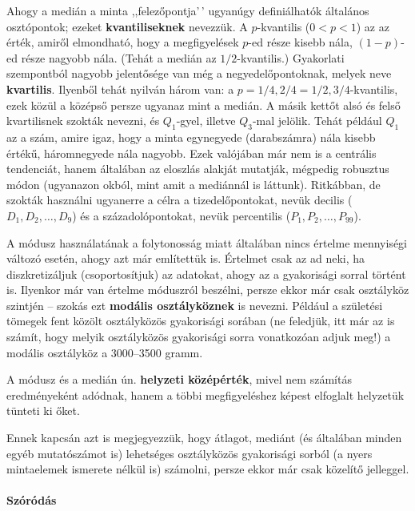 \documentclass[
]{book}
\begin{document}
Ahogy a medián a minta ,,felezőpontja'\,' ugyanúgy definiálhatók általános osztópontok; ezeket \textbf{kvantiliseknek} nevezzük. A \(p\)-kvantilis (\(0<p<1\)) az az érték, amiről elmondható, hogy a megfigyelések \(p\)-ed része kisebb nála, \(\left(1-p\right)\)-ed része nagyobb nála. (Tehát a medián az \(1/2\)-kvantilis.) Gyakorlati szempontból nagyobb jelentősége van még a negyedelőpontoknak, melyek neve \textbf{kvartilis}. Ilyenből tehát nyilván három van: a \(p=1/4,2/4=1/2,3/4\)-kvantilis, ezek közül a középső persze ugyanaz mint a medián. A másik kettőt alsó és felső kvartilisnek szokták nevezni, és \(Q_1\)-gyel, illetve \(Q_3\)-mal jelölik. Tehát például \(Q_1\) az a szám, amire igaz, hogy a minta egynegyede (darabszámra) nála kisebb értékű, háromnegyede nála nagyobb. Ezek valójában már nem is a centrális tendenciát, hanem általában az eloszlás alakját mutatják, mégpedig robusztus módon (ugyanazon okból, mint amit a mediánnál is láttunk). Ritkábban, de szokták használni ugyanerre a célra a tizedelőpontokat, nevük decilis (\(D_1,D_2,\ldots,D_9\)) és a századolópontokat, nevük percentilis (\(P_1,P_2,\ldots,P_{99}\)).

A módusz használatának a folytonosság miatt általában nincs értelme mennyiségi változó esetén, ahogy azt már említettük is. Értelmet csak az ad neki, ha diszkretizáljuk (csoportosítjuk) az adatokat, ahogy az a gyakorisági sorral történt is. Ilyenkor már van értelme móduszról beszélni, persze ekkor már csak osztályköz szintjén -- szokás ezt \textbf{modális osztályköznek} is nevezni. Például a születési tömegek fent közölt osztályközös gyakorisági sorában (ne feledjük, itt már az is számít, hogy melyik osztályközös gyakorisági sorra vonatkozóan adjuk meg!) a modális osztályköz a 3000--3500 gramm.

A módusz és a medián ún. \textbf{helyzeti középérték}, mivel nem számítás eredményeként adódnak, hanem a többi megfigyeléshez képest elfoglalt helyzetük tünteti ki őket.

Ennek kapcsán azt is megjegyezzük, hogy átlagot, mediánt (és általában minden egyéb mutatószámot is) lehetséges osztályközös gyakorisági sorból (a nyers mintaelemek ismerete nélkül is) számolni, persze ekkor már csak közelítő jelleggel.

\hypertarget{deskriptivmennyegyvaltanalitikusmutatoszamokszorodas}{%
\paragraph{Szóródás}\label{deskriptivmennyegyvaltanalitikusmutatoszamokszorodas}}
\end{document}
